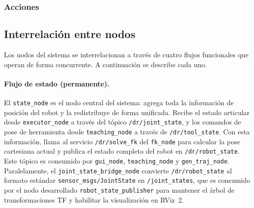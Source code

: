 \documentclass{article}
\begin{document}
\subsubsection*{Acciones}

\begin{table}[H]
    \centering
    \caption{Acción personalizada (\texttt{dr\_interfaces/action}).}
    \label{tab:ros2_actions}
    \renewcommand{\arraystretch}{1.3}
\end{table}

\subsection{Interrelación entre nodos}
\label{sec:ros2_interrelacion}

Los nodos del sistema se interrelacionan a través de cuatro flujos funcionales que operan de forma concurrente. A continuación se describe cada uno.

\paragraph{Flujo de estado (permanente).}
El \texttt{state\_node} es el nodo central del sistema: agrega toda la información de posición del robot y la redistribuye de forma unificada. Recibe el estado articular desde \texttt{executor\_node} a través del tópico \texttt{/dr/joint\_state}, y los comandos de pose de herramienta desde \texttt{teaching\_node} a través de \texttt{/dr/tool\_state}. Con esta información, llama al servicio \texttt{/dr/solve\_fk} del \texttt{fk\_node} para calcular la pose cartesiana actual y publica el estado completo del robot en \texttt{/dr/robot\_state}. Este tópico es consumido por \texttt{gui\_node}, \texttt{teaching\_node} y \texttt{gen\_traj\_node}. Paralelamente, el \texttt{joint\_state\_bridge\_node} convierte \texttt{/dr/robot\_state} al formato estándar \texttt{sensor\_msgs/JointState} en \texttt{/joint\_states}, que es consumido por el nodo desarrollado \texttt{robot\_state\_publisher} para mantener el árbol de transformaciones TF y habilitar la visualización en RViz~2.
\end{document}
